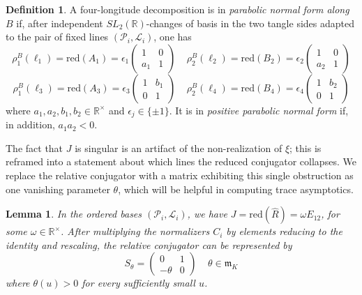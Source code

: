 \documentclass{article}
\theoremstyle{plain}
\theoremstyle{definition}
\newtheorem{definition}[theorem]{Definition}
\theoremstyle{plain}
\theoremstyle{plain}
\theoremstyle{plain}
\newtheorem{lemma}[theorem]{Lemma}
\theoremstyle{remark}
\theoremstyle{remark}
\theoremstyle{plain}
\theoremstyle{plain}
\theoremstyle{plain}
\theoremstyle{plain}
\begin{document}
\begin{definition}\label{def:normalform}
A four-longitude decomposition is in \emph{parabolic normal form along $B$} if, after independent $SL_2(\mathbb{R})$-changes of basis in the two tangle sides adapted to the pair of fixed lines $(\mathcal P_i, \mathcal L_i)$, one has
\begin{equation*}
	\rho_1^B(\ell_1) = \mathrm{red}(A_1) = \epsilon_1\begin{pmatrix}1 & 0 \\ a_1 & 1\end{pmatrix} \ \ \ \ \ \rho_2^B(\ell_2) = \mathrm{red}(B_2) = \epsilon_2\begin{pmatrix}1 & 0 \\ a_2 & 1\end{pmatrix}
\end{equation*}
\begin{equation*}
	\rho_1^B(\ell_3) = \mathrm{red}(A_3) = \epsilon_3\begin{pmatrix}1 & b_1 \\ 0 & 1\end{pmatrix} \ \ \ \ \ \rho_2^B(\ell_4) = \mathrm{red}(B_4) = \epsilon_4\begin{pmatrix}1 & b_2 \\ 0 & 1\end{pmatrix}
\end{equation*}
where $a_1, a_2, b_1, b_2 \in \mathbb R^\times$ and $\epsilon_j \in \{\pm 1\}$. It is in \emph{positive parabolic normal form} if, in addition, $a_1a_2 < 0$. 
\end{definition}

The fact that $J$ is singular is an artifact of the non-realization of $\xi$; this is reframed into a statement about which lines the reduced conjugator collapses. We replace the relative conjugator with a matrix exhibiting this single obstruction as one vanishing parameter $\theta$, which will be helpful in computing trace asymptotics. 

\begin{lemma}\label{lma:antidiag}
In the ordered bases $(\mathcal P_i, \mathcal L_i)$, we have $J = \mathrm{red}(\widehat R) = \omega E_{12}$, for some $\omega \in \mathbb{R}^\times$. After multiplying the normalizers $C_i$ by elements reducing to the identity and rescaling, the relative conjugator can be represented by 
\begin{equation*}
	S_\theta = \begin{pmatrix}0&1 \\ -\theta & 0\end{pmatrix} \ \ \ \ \ \theta \in \mathfrak m_K
\end{equation*}
where $\theta(u) > 0$ for every sufficiently small $u$. 
\end{lemma}
\end{document}
